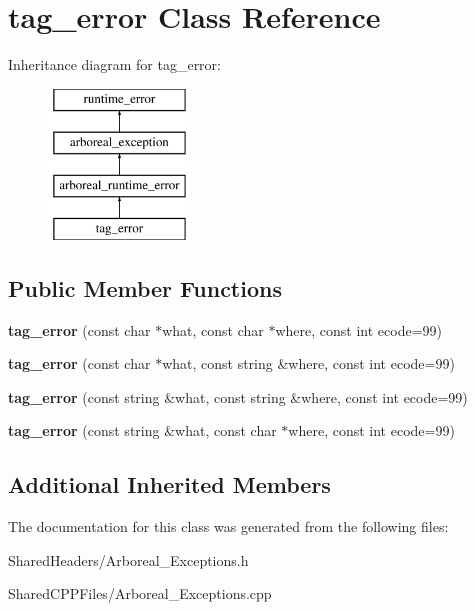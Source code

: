 \hypertarget{classtag__error}{}\section{tag\+\_\+error Class Reference}
\label{classtag__error}
Inheritance diagram for tag\+\_\+error\+:\begin{figure}[H]
\begin{center}
\leavevmode
\includegraphics[height=4.000000cm]{classtag__error}
\end{center}
\end{figure}
\subsection*{Public Member Functions}
\begin{DoxyCompactItemize}
\item 
{\bfseries tag\+\_\+error} (const char $\ast$what, const char $\ast$where, const int ecode=99)\hypertarget{classtag__error_a49b7eb59916bbc065f7d79bbf31cb460}{}\label{classtag__error_a49b7eb59916bbc065f7d79bbf31cb460}

\item 
{\bfseries tag\+\_\+error} (const char $\ast$what, const string \&where, const int ecode=99)\hypertarget{classtag__error_abc7794a3cf421776f77b781b4bef9dfb}{}\label{classtag__error_abc7794a3cf421776f77b781b4bef9dfb}

\item 
{\bfseries tag\+\_\+error} (const string \&what, const string \&where, const int ecode=99)\hypertarget{classtag__error_afc103fa30ef508088c2cb4eda60837d2}{}\label{classtag__error_afc103fa30ef508088c2cb4eda60837d2}

\item 
{\bfseries tag\+\_\+error} (const string \&what, const char $\ast$where, const int ecode=99)\hypertarget{classtag__error_a70a4e7f9da04ca034f23e42ce1e95433}{}\label{classtag__error_a70a4e7f9da04ca034f23e42ce1e95433}

\end{DoxyCompactItemize}
\subsection*{Additional Inherited Members}


The documentation for this class was generated from the following files\+:\begin{DoxyCompactItemize}
\item 
Shared\+Headers/Arboreal\+\_\+\+Exceptions.\+h\item 
Shared\+C\+P\+P\+Files/Arboreal\+\_\+\+Exceptions.\+cpp\end{DoxyCompactItemize}
